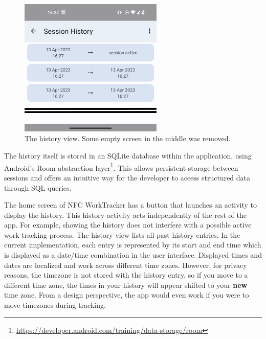 \documentclass[conference]{IEEEtran}
\newcommand{\projectname}{NFC WorkTracker}
\newcommand{\phonescreenwidth}{2.69in}
\begin{document}
\begin{figure}
	\centering
	\includegraphics[width=\phonescreenwidth]{screenshots/history_smaller.png}
	\caption{The history view. Some empty screen in the middle was removed.}
	\label{fig:history}
\end{figure}

The history itself is stored in an SQLite database within the application, using Android's Room abstraction layer\footnote{\url{https://developer.android.com/training/data-storage/room}}. This allows persistent storage between sessions and offers an intuitive way for the developer to access structured data through SQL queries.

The home screen of \projectname{} has a button that launches an activity to display the history. This history-activity acts independently of the rest of the app. For example, showing the history does not interfere with a possible active work tracking process. The history view lists all past history entries. In the current implementation, each entry is represented by its start and end time which is displayed as a date/time combination in the user interface. Displayed times and dates are localized and work across different time zones. However, for privacy reasons, the timezone is not stored with the history entry, so if you move to a different time zone, the times in your history will appear shifted to your \textbf{new} time zone. From a design perspective, the app would even work if you were to move timezones during tracking.
\end{document}

